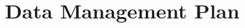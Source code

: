 \documentclass[preprint]{aastex}
\begin{document}
\title{Data Management Plan}

% 
% 
% 
% 
% 

% 
\end{document}
